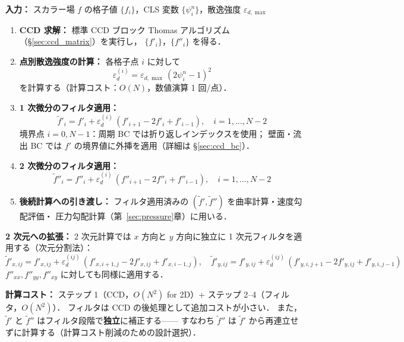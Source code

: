 \begin{tcolorbox}[algbox, title={適応 Dissipative-CCD フィルタの実装アルゴリズム}]
\label{alg:dccd}
\textbf{入力：} スカラー場 $f$ の格子値 $\{f_i\}$，CLS 変数 $\{\psi_i^n\}$，散逸強度 $\varepsilon_{d,\max}$

\begin{enumerate}
  \item \textbf{CCD 求解：}
        標準 CCD ブロック Thomas アルゴリズム（§\ref{sec:ccd_matrix}）を実行し，
        $\{f'_i\}$，$\{f''_i\}$ を得る．
  \item \textbf{点別散逸強度の計算：}
        各格子点 $i$ に対して
        \[
          \varepsilon_d^{(i)} = \varepsilon_{d,\max}\,(2\psi_i^n - 1)^2
        \]
        を計算する（計算コスト：$O(N)$，数値演算 1 回/点）．
  \item \textbf{1 次微分のフィルタ適用：}
        \[
          \tilde{f}'_i = f'_i + \varepsilon_d^{(i)}\,(f'_{i+1} - 2f'_i + f'_{i-1}),
          \quad i = 1, \ldots, N-2
        \]
        境界点 $i=0, N-1$：周期 BC では折り返しインデックスを使用；
        壁面・流出 BC では $f'$ の境界値に外挿を適用（詳細は §\ref{sec:ccd_bc}）．
  \item \textbf{2 次微分のフィルタ適用：}
        \[
          \tilde{f}''_i = f''_i + \varepsilon_d^{(i)}\,(f''_{i+1} - 2f''_i + f''_{i-1}),
          \quad i = 1, \ldots, N-2
        \]
  \item \textbf{後続計算への引き渡し：}
        フィルタ適用済みの $(\tilde{f}', \tilde{f}'')$ を曲率計算・速度勾配評価・
        圧力勾配計算（第~\ref{sec:pressure}章）に用いる．
\end{enumerate}

\textbf{2 次元への拡張：}
2 次元計算では $x$ 方向と $y$ 方向に独立に 1 次元フィルタを適用する（次元分割法）：
\[
  \tilde{f}'_{x,ij} = f'_{x,ij} + \varepsilon_d^{(ij)}\,(f'_{x,i+1,j} - 2f'_{x,ij} + f'_{x,i-1,j}),
  \quad
  \tilde{f}'_{y,ij} = f'_{y,ij} + \varepsilon_d^{(ij)}\,(f'_{y,i,j+1} - 2f'_{y,ij} + f'_{y,i,j-1})
\]
$f''_{xx}, f''_{yy}, f''_{xy}$ に対しても同様に適用する．

\textbf{計算コスト：} ステップ 1（CCD，$O(N^2)$ for 2D）+ ステップ 2--4（フィルタ，$O(N^2)$）．
フィルタは CCD の後処理として追加コストが小さい．
また，$\tilde{f}'$ と $\tilde{f}''$ はフィルタ段階で\textbf{独立}に補正する——
すなわち $\tilde{f}''$ は $\tilde{f}'$ から再連立せずに計算する（計算コスト削減のための設計選択）．
\end{tcolorbox}

